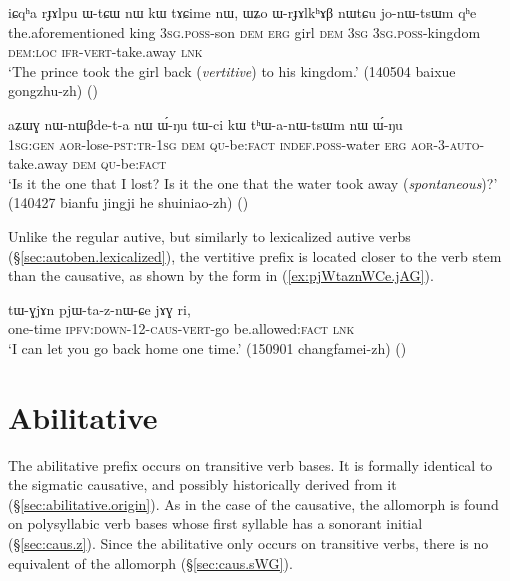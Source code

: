 \begin{exe}
\ex \label{ex:WrJAlkhAB.nWtCu.jonWtsWm}
\gll iɕqʰa rɟɤlpu ɯ-tɕɯ nɯ kɯ tɤɕime nɯ, ɯʑo ɯ-rɟɤlkʰɤβ nɯtɕu jo-nɯ-tsɯm qʰe \\
the.aforementioned king \textsc{3sg}.\textsc{poss}-son \textsc{dem} \textsc{erg} girl \textsc{dem} \textsc{3sg} \textsc{3sg}.\textsc{poss}-kingdom \textsc{dem}:\textsc{loc} \textsc{ifr}-\textsc{vert}-take.away \textsc{lnk} \\
\glt `The prince took the girl back (\textit{vertitive}) to his kingdom.' (140504 baixue gongzhu-zh)
()
\end{exe}

\begin{exe}
\ex \label{ex:tWci.kW.thanWtsWm}
\gll aʑɯɣ nɯ-nɯβde-t-a nɯ ɯ́-ŋu tɯ-ci kɯ tʰɯ-a-nɯ-tsɯm nɯ ɯ́-ŋu\\
\textsc{1sg}:\textsc{gen} \textsc{aor}-lose-\textsc{pst}:\textsc{tr}-\textsc{1sg} \textsc{dem} \textsc{qu}-be:\textsc{fact} \textsc{indef}.\textsc{poss}-water \textsc{erg} \textsc{aor}-3\flobv{}-\textsc{auto}-take.away \textsc{dem} \textsc{qu}-be:\textsc{fact} \\
\glt `Is it the one that I lost? Is it the one that the water took away (\textit{spontaneous})?' (140427 bianfu jingji he shuiniao-zh)
()
\end{exe}

Unlike the regular autive, but similarly to lexicalized autive verbs (§\ref{sec:autoben.lexicalized}), the vertitive prefix is located closer to the verb stem than the causative, as shown by the form  in (\ref{ex:pjWtaznWCe.jAG}).

\begin{exe}
\ex \label{ex:pjWtaznWCe.jAG}
\gll  tɯ-ɣjɤn pjɯ-ta-z-nɯ-ɕe jɤɣ ri,  \\
one-time \textsc{ipfv}:\textsc{down}-1\fl{}2-\textsc{caus}-\textsc{vert}-go be.allowed:\textsc{fact} \textsc{lnk} \\
\glt `I can let you go back home one time.' (150901 changfamei-zh) ()
\end{exe}

\section{Abilitative} \label{sec:abilitative} 
The abilitative  prefix occurs on transitive verb bases. It is formally identical to the sigmatic causative, and possibly historically derived from it (§\ref{sec:abilitative.origin}).  As in the case of the causative, the allomorph  is found on polysyllabic verb bases whose first syllable has a sonorant initial (§\ref{sec:caus.z}). Since the abilitative only occurs on transitive verbs, there is no equivalent of the  allomorph (§\ref{sec:caus.sWG}).


